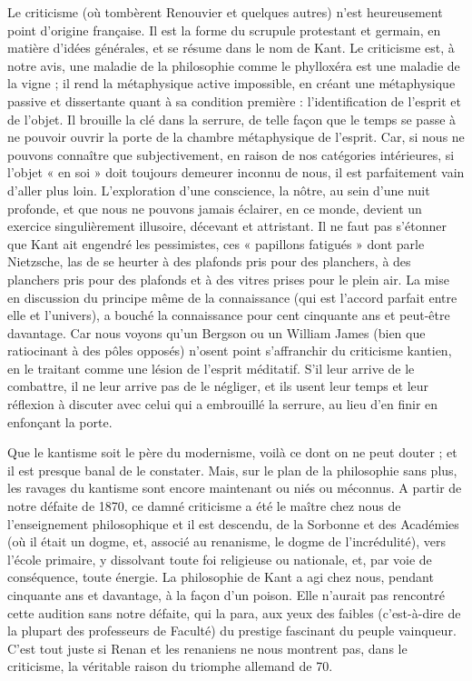 \documentclass[french,twoside]{book} %
\begin{document}
Le criticisme (où tombèrent Renouvier et quelques autres) n’est heureusement point d’origine française. Il est la forme du scrupule protestant et germain, en matière d’idées générales, et se résume dans le nom de Kant. Le criticisme est, à notre avis, une maladie de la philosophie comme le phylloxéra est une maladie de la vigne ; il rend la métaphysique active impossible, en créant une métaphysique passive et dissertante quant à sa condition première : l’identification de l’esprit et de l’objet. Il brouille la clé dans la serrure, de telle façon que le temps se passe à ne pouvoir ouvrir la porte de la chambre métaphysique de l’esprit. Car, si nous ne pouvons connaître que subjectivement, en raison de nos catégories intérieures, si l’objet « en soi » doit toujours demeurer inconnu de nous, il est parfaitement vain d’aller plus loin. L’exploration d’une conscience, la nôtre, au sein d’une nuit profonde, et que nous ne pouvons jamais éclairer, en ce monde, devient un exercice singulièrement illusoire, décevant et attristant. Il ne faut pas s’étonner que Kant ait engendré les pessimistes, ces « papillons fatigués » dont parle Nietzsche, las de se heurter à des plafonds pris pour des planchers, à des planchers pris pour des plafonds et à des vitres prises pour le plein air. La mise en discussion du principe même de la connaissance (qui est l’accord parfait entre elle et l’univers), a bouché la connaissance pour cent cinquante ans et peut-être davantage. Car nous voyons qu’un Bergson ou un William James (bien que ratiocinant à des pôles opposés) n’osent point s’affranchir du criticisme kantien, en le traitant comme une lésion de l’esprit méditatif. S’il leur arrive de le combattre, il ne leur arrive pas de le négliger, et ils usent leur temps et leur réflexion à discuter avec celui qui a embrouillé la serrure, au lieu d’en finir en enfonçant la porte.\par
Que le kantisme soit le père du modernisme, voilà ce dont on ne peut douter ; et il est presque banal de le constater. Mais, sur le plan de la philosophie sans plus, les ravages du kantisme sont encore maintenant ou niés ou méconnus. A partir de notre défaite de 1870, ce damné criticisme a été le maître chez nous de l’enseignement philosophique et il est descendu, de la Sorbonne et des Académies (où il était un dogme, et, associé au renanisme, le dogme de l’incrédulité), vers l’école primaire, y dissolvant toute foi religieuse ou nationale, et, par voie de conséquence, toute énergie. La philosophie de Kant a agi chez nous, pendant cinquante ans et davantage, à la façon d’un poison. Elle n’aurait pas rencontré cette audition sans notre défaite, qui la para, aux yeux des faibles (c’est-à-dire de la plupart des professeurs de Faculté) du prestige fascinant du peuple vainqueur. C’est tout juste si Renan et les renaniens ne nous montrent pas, dans le criticisme, la véritable raison du triomphe allemand de 70.\par
\end{document}
